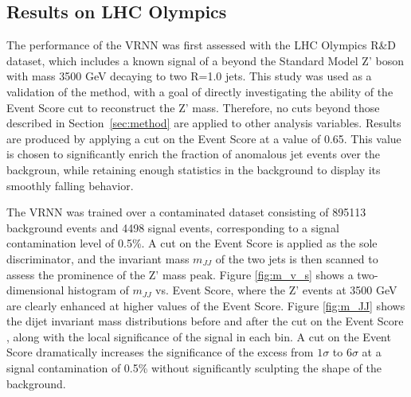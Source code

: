 \documentclass[letterpaper,11pt]{article}
\begin{document}
\subsection{Results on LHC Olympics}
\label{sec:results}


The performance of the VRNN was first assessed with the LHC Olympics R\&D dataset, which includes a known signal of a beyond the Standard Model Z' boson with mass 3500 GeV decaying to two R=1.0 jets. This study was used as a validation of the method, with a goal of directly investigating the ability of the Event Score cut to reconstruct the Z' mass. Therefore, no cuts beyond those described in Section~\ref{sec:method} are applied to other analysis variables. 
Results are produced by applying a cut on the Event Score at a value of 0.65. This value is chosen to significantly enrich the fraction of anomalous jet events over the backgroun, while retaining enough statistics in the background to display its smoothly falling behavior.

The VRNN was trained over a contaminated dataset consisting of 895113 background events and 4498 signal events, corresponding to a signal contamination level of 0.5\%.
A cut on the Event Score is applied as the sole discriminator, and the invariant mass $m_{JJ}$ of the two jets is then scanned to assess the prominence of the Z' mass peak.
Figure \ref{fig:m_v_s} shows a two-dimensional histogram of $m_{JJ}$ vs. Event Score, where the Z' events at 3500 GeV are clearly enhanced at higher values of the Event Score. 
Figure \ref{fig:m_JJ} shows the dijet invariant mass distributions before and after the cut on the Event Score , along with the local significance of the signal in each bin. 
A cut on the Event Score dramatically increases the significance of the excess from $1\sigma$ to $6\sigma$ at a signal contamination of 0.5\% without significantly sculpting the shape of the background.
\end{document}
